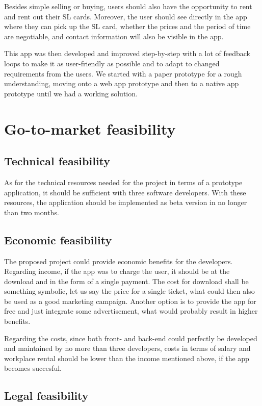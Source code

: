 \documentclass[11pt,twoside,a4paper]{report}
\begin{document}
Besides simple selling or buying, users should also have the opportunity to rent and rent out their SL cards. Moreover, the user should see directly in the app where they can pick up the SL card, whether the prices and the period of time are negotiable, and contact information will also be visible in the app.

This app was then developed and improved step-by-step with a lot of feedback loops to make it as user-friendly as possible and to adapt to changed requirements from the users. We started with a paper prototype for a rough understanding, moving onto a web app prototype and then to a native app prototype until we had a working solution.

\chapter{Go-to-market feasibility}

\section{Technical feasibility}

As for the technical resources needed for the project in terms of a prototype application, it should be sufficient with three software developers. With these resources, the application should be implemented as beta version in no longer than two months.

\section{Economic feasibility}

The proposed project could provide economic benefits for the developers. Regarding income, if the app was to charge the user, it should be at the download and in the form of a single payment. The cost for download shall be something symbolic, let us say the price for a single ticket, what could then also be used as a good marketing campaign. Another option is to provide the app for free and just integrate some advertisement, what would probably result in higher benefits.

Regarding the costs, since both front- and back-end could perfectly be developed and maintained by no more than three developers, costs in terms of salary and workplace rental should be lower than the income mentioned above, if the app becomes succesful.

\section{Legal feasibility}
\end{document}
